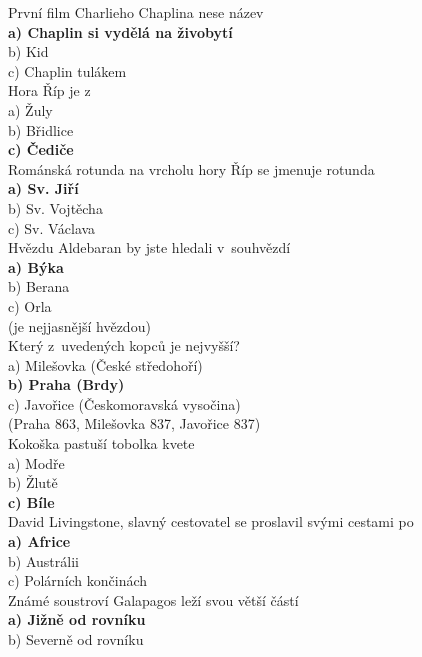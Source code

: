 \begin{multicols}{4}
\noindent
První film Charlieho Chaplina nese název\\
\textbf{a) Chaplin si vydělá na živobytí}\\
b) Kid\\
c) Chaplin tulákem\\

\noindent
Hora Říp je z \\
a) Žuly\\
b) Břidlice\\
\textbf{c) Čediče}\\

\noindent
Románská rotunda na vrcholu hory Říp se jmenuje rotunda\\
\textbf{a) Sv. Jiří}\\
b) Sv. Vojtěcha\\
c) Sv. Václava\\

\noindent
Hvězdu Aldebaran by jste hledali v~souhvězdí\\
\textbf{a) Býka}\\
b) Berana\\
c) Orla\\
(je nejjasnější hvězdou)\\

\noindent
Který z~uvedených kopců je nejvyšší?\\
a) Milešovka (České středohoří)\\
\textbf{b) Praha (Brdy)}\\
c) Javořice (Českomoravská vysočina)\\
(Praha 863, Milešovka 837, Javořice 837)\\

\noindent
Kokoška pastuší tobolka kvete\\
a) Modře\\
b) Žlutě\\
\textbf{c) Bíle}\\

\noindent
David Livingstone, slavný cestovatel se proslavil svými cestami 
po\\
\textbf{a) Africe}\\
b) Austrálii\\
c) Polárních končinách\\

\noindent
Známé soustroví Galapagos leží svou větší částí\\
\textbf{a) Jižně od rovníku}\\
b) Severně od rovníku\\


\end{multicols}
